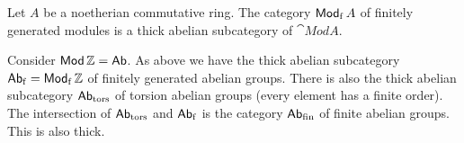 \begin{exa}
Let $A$ be a noetherian commutative ring. 
The category $\operatorname{\mathsf{Mod}}_{\mathrm{f}} A$ of finitely generated
modules is a thick abelian subcategory of $\cat{Mod} A$.
\end{exa}

\begin{exa}
Consider $\operatorname{\mathsf{Mod}} \mathbb{Z} = \operatorname{\mathsf{Ab}}$. 
As above we have the thick abelian subcategory 
$\operatorname{\mathsf{Ab}}_{\mathrm{f}} = \operatorname{\mathsf{Mod}}_{\mathrm{f}} \mathbb{Z}$ of finitely generated
abelian groups.
There is also the thick abelian subcategory 
$\operatorname{\mathsf{Ab}}_{\mathrm{tors}}$ of torsion abelian groups (every element has a finite
order). The intersection of $\operatorname{\mathsf{Ab}}_{\mathrm{tors}}$ and 
$\operatorname{\mathsf{Ab}}_{\mathrm{f}}$ is the category $\operatorname{\mathsf{Ab}}_{\mathrm{fin}}$ of finite abelian
groups. This is also thick. 
\end{exa}

